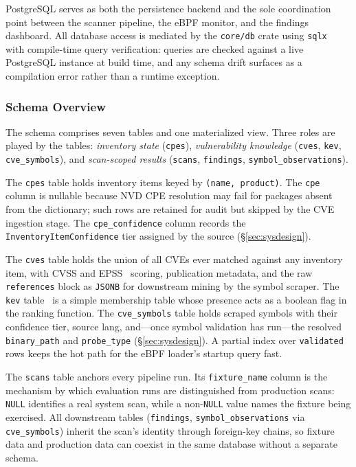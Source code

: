 \documentclass[conference]{IEEEtran}
\begin{document}
PostgreSQL serves as both the persistence backend and the sole coordination point between the scanner pipeline, the eBPF monitor, and the findings dashboard.
All database access is mediated by the \texttt{core/db} crate using \texttt{sqlx}~\cite{sqlx} with compile-time query verification: queries are checked against a live PostgreSQL instance at build time, and any schema drift surfaces as a compilation error rather than a runtime exception.

\subsubsection{Schema Overview}

The schema comprises seven tables and one materialized view.
Three roles are played by the tables: \emph{inventory state} (\texttt{cpes}), \emph{vulnerability knowledge} (\texttt{cves}, \texttt{kev}, \texttt{cve\_symbols}), and \emph{scan-scoped results} (\texttt{scans}, \texttt{findings}, \texttt{symbol\_observations}).

The \texttt{cpes} table holds inventory items keyed by \texttt{(name, product)}.
The \texttt{cpe} column is nullable because NVD CPE resolution may fail for packages absent from the dictionary; such rows are retained for audit but skipped by the CVE ingestion stage.
The \texttt{cpe\_confidence} column records the \texttt{InventoryItemConfidence} tier assigned by the source (\S\ref{sec:sysdesign}).

The \texttt{cves} table holds the union of all CVEs ever matched against any inventory item, with CVSS and EPSS~\cite{epss} scoring, publication metadata, and the raw \texttt{references} block as \texttt{JSONB} for downstream mining by the symbol scraper.
The \texttt{kev} table~\cite{cisa_kev} is a simple membership table whose presence acts as a boolean flag in the ranking function.
The \texttt{cve\_symbols} table holds scraped symbols with their confidence tier, source lang, and---once symbol validation has run---the resolved \texttt{binary\_path} and \texttt{probe\_type} (\S\ref{sec:sysdesign}).
A partial index over \texttt{validated} rows keeps the hot path for the eBPF loader's startup query fast.

The \texttt{scans} table anchors every pipeline run.
Its \texttt{fixture\_name} column is the mechanism by which evaluation runs are distinguished from production scans: \texttt{NULL} identifies a real system scan, while a non-\texttt{NULL} value names the fixture being exercised.
All downstream tables (\texttt{findings}, \texttt{symbol\_observations} via \texttt{cve\_symbols}) inherit the scan's identity through foreign-key chains, so fixture data and production data can coexist in the same database without a separate schema.
\end{document}
